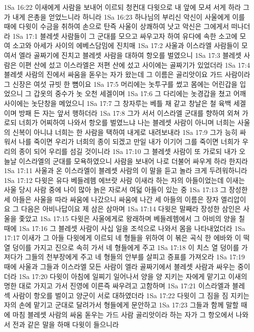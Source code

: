 1Sa 16:22  이새에게 사람을 보내어 이르되 청컨대 다윗으로 내 앞에 모셔 서게 하라 그가 내게 은총을 얻었느니라 하니라
1Sa 16:23  하나님의 부리신 악신이 사울에게 이를 때에 다윗이 수금을 취하여 손으로 탄즉 사울이 상쾌하여 낫고 악신은 그에게서 떠나더라
1Sa 17:1  블레셋 사람들이 그 군대를 모으고 싸우고자 하여 유다에 속한 소고에 모여 소고와 아세가 사이의 에베스담밈에 진치매
1Sa 17:2  사울과 이스라엘 사람들이 모여서 엘라 골짜기에 진치고 블레셋 사람을 대하여 항오를 벌였으니
1Sa 17:3  블레셋 사람은 이편 산에 섰고 이스라엘은 저편 산에 섰고 사이에는 골짜기가 있었더라
1Sa 17:4  블레셋 사람의 진에서 싸움을 돋우는 자가 왔는데 그 이름은 골리앗이요 가드 사람이라 그 신장은 여섯 규빗 한 뼘이요
1Sa 17:5  머리에는 놋투구를 썼고 몸에는 어린갑을 입었으니 그 갑옷의 중수가 놋 오천 세겔이며
1Sa 17:6  그 다리에는 놋경갑을 쳤고 어깨 사이에는 놋단창을 메었으니
1Sa 17:7  그 창자루는 베틀 채 같고 창날은 철 육백 세겔이며 방패 든 자는 앞서 행하더라
1Sa 17:8  그가 서서 이스라엘 군대를 향하여 외쳐 가로되 너희가 어찌하여 나와서 항오를 벌였느냐 나는 블레셋 사람이 아니며 너희는 사울의 신복이 아니냐 너희는 한 사람을 택하여 내게로 내려보내라
1Sa 17:9  그가 능히 싸워서 나를 죽이면 우리가 너희의 종이 되겠고 만일 내가 이기어 그를 죽이면 너희가 우리의 종이 되어 우리를 섬길 것이니라
1Sa 17:10  그 블레셋 사람이 또 가로되 내가 오늘날 이스라엘의 군대를 모욕하였으니 사람을 보내어 나로 더불어 싸우게 하라 한지라
1Sa 17:11  사울과 온 이스라엘이 블레셋 사람의 이 말을 듣고 놀라 크게 두려워하니라
1Sa 17:12  다윗은 유다 베들레헴 에브랏 사람 이새라 하는 자의 아들이었는데 이새는 사울 당시 사람 중에 나이 많아 늙은 자로서 여덟 아들이 있는 중
1Sa 17:13  그 장성한 세 아들은 사울을 따라 싸움에 나갔으니 싸움에 나간 세 아들의 이름은 장자 엘리압이요 그 다음은 아비나답이요 제 삼은 삼마며
1Sa 17:14  다윗은 말째라 장성한 삼인은 사울을 좇았고
1Sa 17:15  다윗은 사울에게로 왕래하며 베들레헴에서 그 아비의 양을 칠때에
1Sa 17:16  그 블레셋 사람이 사십 일을 조석으로 나와서 몸을 나타내었더라
1Sa 17:17  이새가 그 아들 다윗에게 이르되 네 형들을 위하여 이 볶은 곡식 한 에바와 이 떡 열 덩이를 가지고 진으로 속히 가서 네 형들에게 주고
1Sa 17:18  이 치스 열 덩이를 가져다가 그들의 천부장에게 주고 네 형들의 안부를 살피고 증표를 가져오라
1Sa 17:19  때에 사울과 그들과 이스라엘 모든 사람이 엘라 골짜기에서 블레셋 사람과 싸우는 중이더라
1Sa 17:20  다윗이 아침에 일찌기 일어나서 양을 양 지키는 자에게 맡기고 이새의 명한 대로 가지고 가서 진영에 이른즉 싸우려고 고함하며
1Sa 17:21  이스라엘과 블레섹 사람이 항오를 벌이고 양군이 서로 대하였더라
1Sa 17:22  다윗이 그 짐을 짐 지키는 자의 손에 맡기고 군대로 달려가서 형들에게 문안하고
1Sa 17:23  그들과 함께 말할 때에 마침 블레셋 사람의 싸움 돋우는 가드 사람 골리앗이라 하는 자가 그 항오에서 나와서 전과 같은 말을 하매 다윗이 들으니라
